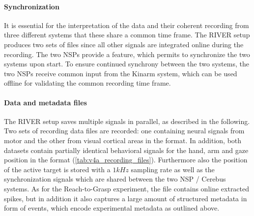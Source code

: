 \paragraph{Synchronization}
It is essential for the interpretation of the data and their coherent recording from three different systems that these share a common time frame. The RIVER setup produces two sets of  files since all other signals are integrated online during the recording. The two NSPs provide a feature, which permits to synchronize the two systems upon start. To ensure continued synchrony between the two systems, the two NSPs receive common input from the Kinarm system, which can be used offline for validating the common recording time frame.

\paragraph{Data and metadata files}
The RIVER setup saves multiple signals in parallel, as described in the following. Two sets of  recording data files are recorded: one containing neural signals from motor and the other from visual cortical areas in the  format. In addition, both datasets contain partially identical behavioral signals for the hand, arm and gaze position in the  format (\cref{tab:v4a_recording_files}). Furthermore also the position of the active target is stored with a $1kHz$ sampling rate as well as the synchronization signals which are shared between the two NSP / Cerebus systems.
As for the Reach-to-Grasp experiment, the  file contains online extracted spikes, but in addition it also captures a large amount of structured metadata in form of events, which encode experimental metadata as outlined above.
